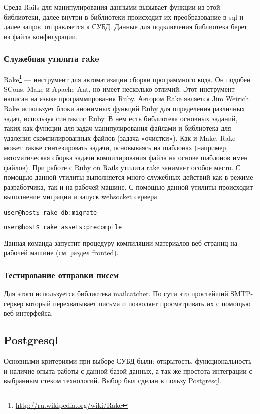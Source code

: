 Среда Rails для манипулирования данными вызывает функции из этой библиотеки,
далее внутри в библиотеки происходит их преобразование в sql и далее запрос
отправляется к СУБД. Данные для подключения библиотека берет из файла
конфигурации.

\subsubsection{Служебная утилита rake}
Rake\footnote{
	\url{http://ru.wikipedia.org/wiki/Rake}
} — инструмент для автоматизации сборки программного кода. Он подобен
SCons, Make и Apache Ant, но имеет несколько отличий. Этот инструмент написан на языке
программирования Ruby. Автором Rake является Jim Weirich.
Rake использует блоки анонимных функций Ruby для определения различных задач,
используя синтаксис Ruby. В нем есть библиотека основных заданий, таких как
функции для задач манипулирования файлами и библиотека для удаления
скомпилированных файлов (задача «очистки»). Как и Make, Rake может также
синтезировать задачи, основываясь на шаблонах (например, автоматическая сборка
задачи компилирования файла на основе шаблонов имен файлов).
При работе с Ruby on Rails утилита rake занимает особое место. С помощью данной
утилиты выполняется много служебных действий как в режиме разработчика, так и на
рабочей машине. С помощью данной утилиты происходит выполнение миграции и запуск
websocket сервера.

\begin{lstlisting}[language=Bash,caption=Выполнение миграций
,label={lst:rails_new_application}] 
user@host$ rake db:migrate
\end{lstlisting}

\begin{lstlisting}[language=Bash,caption=Компиляция ресурсов
,label={lst:rails_new_application}] 
user@host$ rake assets:precompile
\end{lstlisting}
 
 Данная команда запустит процедуру компиляции материалов веб-страниц на рабочей
 машине (см. раздел fronted).
 
 \subsubsection{Тестирование отправки писем}
 Для этого используется библиотека mailcatcher. По сути это простейший
 SMTP-сервер который перехватывает письма и позволяет просматривать их с помощью
 веб-интерфейса.
 
 \subsection{Postgresql}
Основными критериями при выборе СУБД были: открытость, функциональность и
наличие опыта работы с данной базой данных, а так же простота интеграции с
выбранным стеком технологий. Выбор был сделан в пользу Postgresql.

